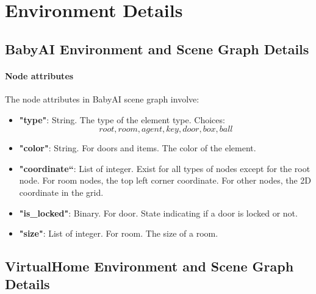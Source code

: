 \pagebreak


\section{Environment Details}
\label{app:EnvDetail}
\subsection{BabyAI Environment and Scene Graph Details}
\label{app:babyAIDetail}
\paragraph{Node attributes} The node attributes in BabyAI scene graph involve:
\begin{itemize}
    \item \textbf{"type"}: String. The type of the element type. Choices: \[root,                room, agent, key, door, box, ball\]
    \item \textbf{"color"}: String. For doors and items. The color of the element.
    \item \textbf{"coordinate“}: List of integer. Exist for all types of nodes except for the root node. For room nodes, the top left corner coordinate. For other nodes, the 2D coordinate in the grid.
    \item \textbf{"is\_locked"}: Binary. For door. State indicating if a door is locked or not.
    \item \textbf{"size"}: List of integer. For room. The size of a room. 
\end{itemize}


\subsection{VirtualHome Environment and Scene Graph Details}
\label{app:VHDetail}

